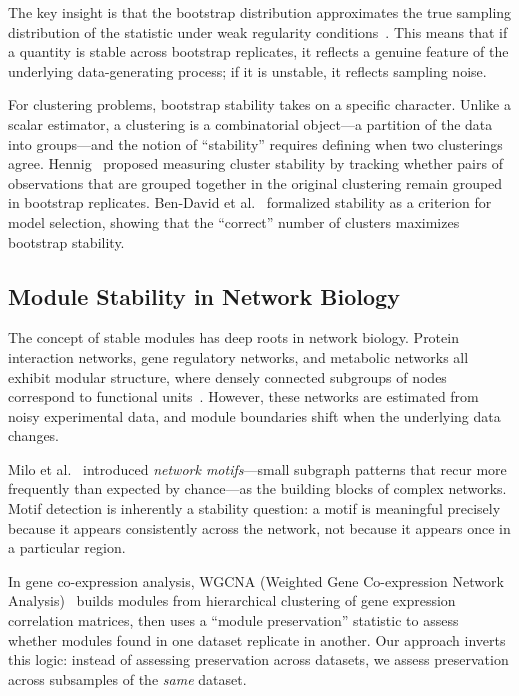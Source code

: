 \documentclass{../yalumba}
\begin{document}

The key insight is that the bootstrap distribution approximates the true
sampling distribution of the statistic under weak regularity
conditions~\cite{hall1992bootstrap}.  This means that if a quantity is stable
across bootstrap replicates, it reflects a genuine feature of the underlying
data-generating process; if it is unstable, it reflects sampling noise.

For clustering problems, bootstrap stability takes on a specific character.
Unlike a scalar estimator, a clustering is a combinatorial object---a partition
of the data into groups---and the notion of ``stability'' requires defining
when two clusterings agree.  Hennig~\cite{hennig2007cluster} proposed measuring
cluster stability by tracking whether pairs of observations that are grouped
together in the original clustering remain grouped in bootstrap replicates.
Ben-David et al.~\cite{bendavid2006stability} formalized stability as a
criterion for model selection, showing that the ``correct'' number of clusters
maximizes bootstrap stability.

\subsection{Module Stability in Network Biology}

The concept of stable modules has deep roots in network biology.  Protein
interaction networks, gene regulatory networks, and metabolic networks all
exhibit modular structure, where densely connected subgroups of nodes correspond
to functional units~\cite{hartwell1999cell}.  However, these networks are
estimated from noisy experimental data, and module boundaries shift when the
underlying data changes.


Milo et al.~\cite{milo2002network} introduced \emph{network motifs}---small
subgraph patterns that recur more frequently than expected by chance---as the
building blocks of complex networks.  Motif detection is inherently a stability
question: a motif is meaningful precisely because it appears consistently across
the network, not because it appears once in a particular region.

In gene co-expression analysis, WGCNA (Weighted Gene Co-expression Network
Analysis)~\cite{langfelder2008wgcna} builds modules from hierarchical
clustering of gene expression correlation matrices, then uses a ``module
preservation'' statistic to assess whether modules found in one dataset
replicate in another.  Our approach inverts this logic: instead of assessing
preservation across datasets, we assess preservation across subsamples of the
\emph{same} dataset.
\end{document}
